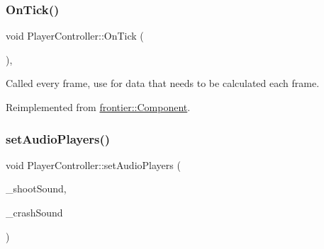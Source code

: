 \subsubsection{\texorpdfstring{On\+Tick()}{OnTick()}}
{\footnotesize\ttfamily void Player\+Controller\+::\+On\+Tick (\begin{DoxyParamCaption}{ }\end{DoxyParamCaption})\hspace{0.3cm}{\ttfamily [override]}, {\ttfamily [virtual]}}



Called every frame, use for data that needs to be calculated each frame. 



Reimplemented from \hyperlink{classfrontier_1_1_component_ab920f9bc07ce051ebb5559c5a66508d1}{frontier\+::\+Component}.

\mbox{\label{class_player_controller_a9bceb77b4a1d71290cc057ab16b64e8b}} 
\subsubsection{\texorpdfstring{set\+Audio\+Players()}{setAudioPlayers()}}
{\footnotesize\ttfamily void Player\+Controller\+::set\+Audio\+Players (\begin{DoxyParamCaption}\item[{std\+::weak\+\_\+ptr$<$ \hyperlink{classfrontier_1_1_audio_player}{frontier\+::\+Audio\+Player} $>$}]{\+\_\+shoot\+Sound,  }\item[{std\+::weak\+\_\+ptr$<$ \hyperlink{classfrontier_1_1_audio_player}{frontier\+::\+Audio\+Player} $>$}]{\+\_\+crash\+Sound }\end{DoxyParamCaption})}

\mbox{\label{class_player_controller_a6fe2f80c8a3bac13c044e848b12f86ab}} 
